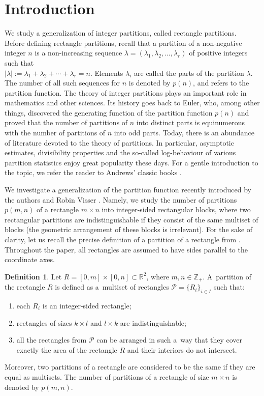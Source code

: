 \documentclass[12pt,a4paper]{amsart}
\numberwithin{equation}{section}
\theoremstyle{plain}
\theoremstyle{definition}
\newtheorem{df}[thm]{Definition}
\theoremstyle{remark}
\begin{document}
\section{Introduction}
We study a generalization of integer partitions, called rectangle partitions.\\ Before defining rectangle partitions, recall that a partition of a non-negative integer $n$ is a non-increasing sequence $\lambda=(\lambda_1,\lambda_2,\ldots,\lambda_r)$ of positive integers such that\\
$|\lambda|:=\lambda_1+\lambda_2+\cdots+\lambda_r=n.$ %
Elements $\lambda_i$ are called the parts of the partition $\lambda$. The number of all such sequences for $n$ is denoted by $p(n)$, and refers to the partition function. The theory of integer partitions plays an important role in mathematics and other sciences. Its history goes back to Euler, who, among other things, discovered the generating function of the partition function $p(n)$ and proved that the number of partitions of $n$ into distinct parts is equinumerous with the number of partitions of $n$ into odd parts. Today, there is an abundance of literature devoted to the theory of partitions. In particular, asymptotic estimates, divisibility properties and the so-called log-behaviour of various partition statistics enjoy great popularity these days. For a gentle introduction to the topic, we refer the reader to Andrews' classic books \cite{Andrews1, Andrews2}.

We investigate a generalization of the partition function recently introduced by the authors and Robin Visser \cite{GVZ2026}. Namely, we study the number of partitions $p(m,n)$ of a rectangle $m\times n$ into integer-sided rectangular blocks, where two rectangular partitions are indistinguishable if they consist of the same multiset of blocks (the geometric arrangement of these blocks is irrelevant). For the sake of clarity, let us recall the precise definition of a partition of a rectangle from \cite{GVZ2026}.
Throughout the paper, all rectangles are assumed to have sides parallel to the coordinate axes. 

\begin{df}\label{def: rectangle partition}
Let $R = [0, m] \times [0, n] \subset \mathbb{R}^2$, where $m, n \in \mathbb{Z}_+$. A~partition of the rectangle $R$ is defined as a~multiset of rectangles
$\mathcal{P} = \{ R_i \}_{i \in I}$ such that:
\begin{enumerate}
    \item each $R_i$ is an integer-sided rectangle;
    \item rectangles of sizes $k\times l$ and $l\times k$ are indistinguishable;  
    \item all the rectangles from $\mathcal{P}$ can be arranged in such a~way that they cover exactly the area of the rectangle $R$ and their interiors do not intersect. 
\end{enumerate}
 Moreover, two partitions of a rectangle are considered to be the same if they are equal as multisets. The number of partitions of a rectangle of size $ m \times n $ is denoted by $p(m,n)$.
\end{df}
\end{document}
